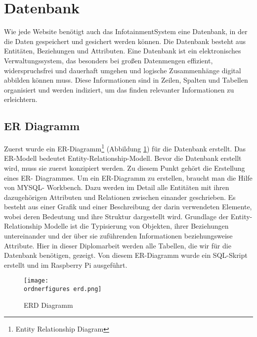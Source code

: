 \section{Datenbank}
Wie jede Website benötigt auch das InfotainmentSystem eine Datenbank, in der die Daten gespeichert und gesichert werden können. Die Datenbank besteht aus Entitäten, Beziehungen und Attributen. Eine Datenbank ist ein elektronisches Verwaltungssystem, das besonders bei großen Datenmengen effizient, widerspruchsfrei und dauerhaft umgehen und logische Zusammenhänge digital abbilden können muss. Diese Informationen sind in Zeilen, Spalten und Tabellen organisiert und werden indiziert, um das finden relevanter Informationen zu erleichtern.

\subsection{ER Diagramm}
Zuerst wurde ein ER-Diagramm\footnote{Entity Relationship Diagram} (Abbildung \ref{fi:erd}) für die Datenbank erstellt. Das ER-Modell bedeutet Entity-Relationship-Modell. Bevor die Datenbank erstellt wird, muss sie zuerst konzipiert werden. Zu diesem Punkt gehört die Erstellung eines ER- Diagrammes. Um ein ER-Diagramm zu erstellen, braucht man die Hilfe von MYSQL- Workbench. Dazu werden im Detail alle Entitäten mit ihren dazugehörigen Attributen und Relationen zwischen einander geschrieben. Es besteht aus einer Grafik und einer Beschreibung der darin verwendeten Elemente, wobei deren Bedeutung und ihre Struktur dargestellt wird. Grundlage der Entity-Relationship Modelle ist die Typisierung von Objekten, ihrer Beziehungen untereinander und der über sie zuführenden Informationen beziehungsweise Attribute. Hier in dieser Diplomarbeit werden alle Tabellen, die wir für die Datenbank benötigen, gezeigt. Von diesem ER-Diagramm wurde ein SQL-Skript erstellt und im Raspberry Pi ausgeführt.

\begin{figure}[H]
	\centering
	\texttt{[image: \\ordnerfigures erd.png]}
	\caption{ERD Diagramm}
	\label{fi:erd}
\end{figure}

